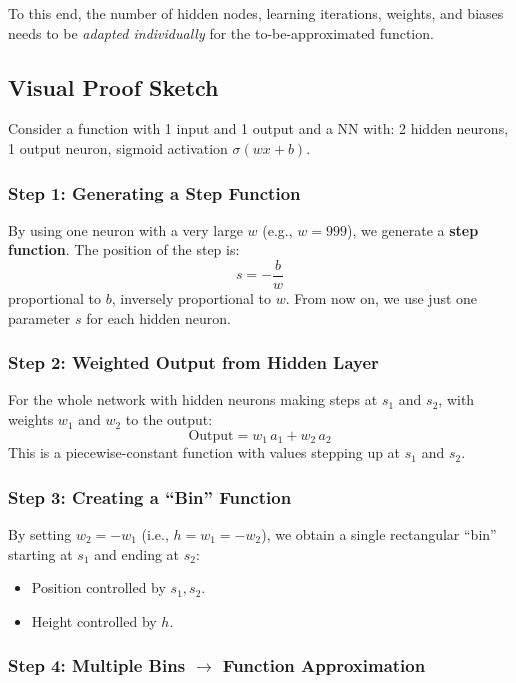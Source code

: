 \documentclass[11pt,a4paper]{article}
\begin{document}
To this end, the number of hidden nodes, learning iterations, weights, and biases needs to be \emph{adapted individually} for the to-be-approximated function.

\subsection{Visual Proof Sketch}

Consider a function with 1 input and 1 output and a NN with: 2 hidden neurons, 1 output neuron, sigmoid activation $\sigma(wx + b)$.

\subsubsection{Step 1: Generating a Step Function}

By using one neuron with a very large $w$ (e.g., $w = 999$), we generate a \textbf{step function}. The position of the step is:
\[
s = -\frac{b}{w}
\]
proportional to $b$, inversely proportional to $w$. From now on, we use just one parameter $s$ for each hidden neuron.

\subsubsection{Step 2: Weighted Output from Hidden Layer}

For the whole network with hidden neurons making steps at $s_1$ and $s_2$, with weights $w_1$ and $w_2$ to the output:
\[
\text{Output} = w_1\, a_1 + w_2\, a_2
\]
This is a piecewise-constant function with values stepping up at $s_1$ and $s_2$.

\subsubsection{Step 3: Creating a ``Bin'' Function}

By setting $w_2 = -w_1$ (i.e., $h = w_1 = -w_2$), we obtain a single rectangular ``bin'' starting at $s_1$ and ending at $s_2$:
\begin{itemize}[leftmargin=*]
    \item Position controlled by $s_1, s_2$.
    \item Height controlled by $h$.
\end{itemize}

\subsubsection{Step 4: Multiple Bins $\to$ Function Approximation}
\end{document}
